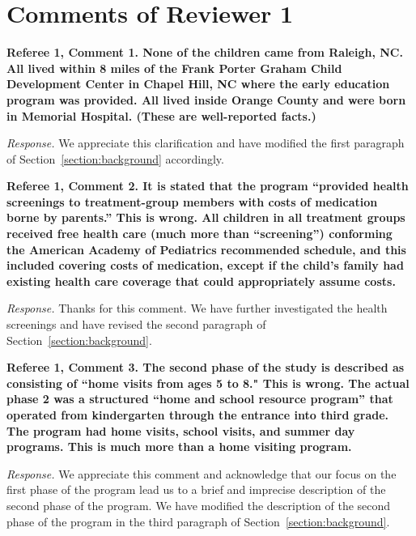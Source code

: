 \section*{Comments of Reviewer 1}

\noindent \textbf{Referee 1, Comment 1. None of the children came from Raleigh, NC. All lived within 8 miles of the Frank Porter Graham Child Development Center in Chapel Hill, NC where the early education program was provided. All lived inside Orange County and were born in Memorial Hospital. (These are well-reported facts.)}

\noindent \textit{Response.} We appreciate this clarification and have modified the first paragraph of Section~\ref{section:background} accordingly.

\noindent \textbf{Referee 1, Comment 2. It is stated that the program ``provided health screenings to treatment-group members with costs of medication borne by parents.'' This is wrong. All children in all treatment groups received free health care (much more than ``screening'') conforming the American Academy of Pediatrics recommended schedule, and this included covering costs of medication, except if the child's family had existing health care coverage that could appropriately assume costs.}

\noindent \textit{Response.} Thanks for this comment. We have further investigated the health screenings and have revised the second paragraph of Section~\ref{section:background}.

\noindent \textbf{Referee 1, Comment 3. The second phase of the study is described as consisting of ``home visits from ages 5 to 8." This is wrong. The actual phase 2 was a structured ``home and school resource program'' that operated from kindergarten through the entrance into third grade. The program had home visits, school visits, and summer day programs. This is much more than a home visiting program.}

\noindent \textit{Response.} We appreciate this comment and acknowledge that our focus on the first phase of the program lead us to a brief and imprecise description of the second phase of the program. We have modified the description of the second phase of the program in the third paragraph of Section~\ref{section:background}.

